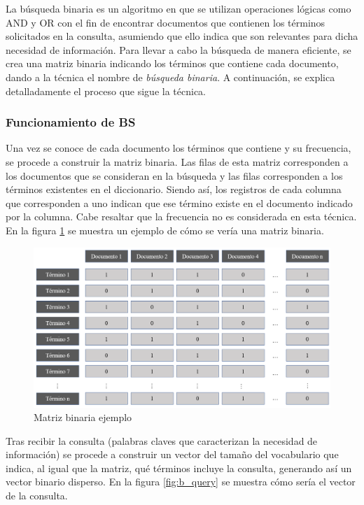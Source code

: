 La búsqueda binaria es un algoritmo en que se utilizan operaciones lógicas como AND y OR con el fin de encontrar documentos que contienen los términos solicitados en la consulta, asumiendo que ello indica que son relevantes para dicha necesidad de información. Para llevar a cabo la búsqueda de manera eficiente, se crea una matriz binaria indicando los términos que contiene cada documento, dando a la técnica el nombre de \textit{búsqueda binaria}. A continuación, se explica detalladamente el proceso que sigue la técnica.

\subsubsection{Funcionamiento de BS}
Una vez se conoce de cada documento los términos que contiene y su frecuencia, se procede a construir la matriz binaria. Las filas de esta matriz corresponden a los documentos que se consideran en la búsqueda y las filas corresponden a los términos existentes en el diccionario. Siendo así, los registros de cada columna que corresponden a uno indican que ese término existe en el documento indicado por la columna. Cabe resaltar que la frecuencia no es considerada en esta técnica. En la figura \ref{fig:b_matrix} se muestra un ejemplo de cómo se vería una matriz binaria.\\

\begin{figure}[H]
    \centering
    \includegraphics[scale=0.5]{doc/images/BS/b_matrix.PNG}
    \caption{Matriz binaria ejemplo}
    \label{fig:b_matrix}
\end{figure}

Tras recibir la consulta (palabras claves que caracterizan la necesidad de información) se procede a construir un vector del tamaño del vocabulario que indica, al igual que la matriz, qué términos incluye la consulta, generando así un vector binario disperso. En la figura \ref{fig:b_query} se muestra cómo sería el vector de la consulta.\\

